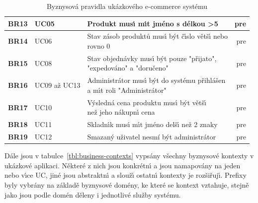 \begin{table}
\begin{tabular}{ l l l r }
        \textbf{BR13} & UC05 & Produkt mus\'{\i} m\'{\i}t jméno s délkou >5 & pre \\ \hline
        \textbf{BR14} & UC06 & \makecell[l]{Stav zásob produktů mus\'{\i} b\'yt č\'{\i}slo větš\'{\i} nebo \\ rovno 0} & pre \\ \hline
        \textbf{BR15} & UC08 & \makecell[l]{Stav objednávky mus\'{\i} b\'yt pouze "přijato", \\ "expedováno" a "doručeno"} & pre \\ \hline
        \textbf{BR16} & UC09 až UC13 & \makecell[l]{Administrátor mus\'{\i} b\'yt do systému přihlášen \\ a m\'{\i}t roli "Administrátor"} & pre \\ \hline
        \textbf{BR17} & UC10 & \makecell[l]{V\'ysledná cena produktu mus\'{\i} b\'yt větš\'{\i} \\ než jeho nákupn\'{\i} cena} & pre \\ \hline
        \textbf{BR18} & UC11 & Skladn\'{\i}k mus\'{\i} m\'{\i}t jméno delš\'{\i} než 2 znaky & pre \\ \hline
        \textbf{BR19} & UC12 & Smazaný uživatel nesmí být administrátor & pre \\ \hline
        \hline
    \end{tabular}
    \caption{Byznysová pravidla ukázkového e-commerce systému}
    \label{tbl:business-rules}
\end{table}

Dále jsou v tabulce~\ref{tbl:business-contexts} vypsány všechny byznysové kontexty v ukázkové aplikaci.
Některé z nich jsou konkrétn\'{\i} a jsou namapovány na jeden nebo v\'{\i}ce \gls{UC},
jiné jsou abstraktn\'{\i} a slouž\'{\i} ostatn\'{\i} kontexty je rozšiřuj\'{\i}.
Prefixy byly vybrány na základě byznysové domény, ke které se kontext vztahuje, stejně jako
jsou podle domén děleny i jednotlivé služby systému.

